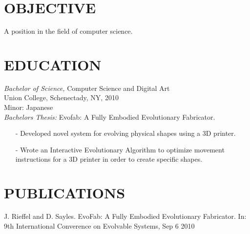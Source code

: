 \documentclass[margin, 10pt]{res} %
\begin{document}
\begin{resume}

 
\section{OBJECTIVE}  

A position in the field of computer science.


\section{EDUCATION}

{\sl Bachelor of Science,} Computer Science and Digital Art \\
Union College, Schenectady, NY, 2010 \\
Minor: Japanese \\
{\sl Bachelors Thesis:} Evofab: A Fully Embodied Evolutionary Fabricator.
\begin{itemize}
\item[-] Developed novel system for evolving physical shapes using a 3D printer.
\item[-] Wrote an Interactive Evolutionary Algorithm to optimize movement instructions for a 3D printer in order to create specific shapes.
\end{itemize}

 
\section{PUBLICATIONS}
J. Rieffel and D. Sayles. EvoFab: A Fully Embodied Evolutionary Fabricator.  In: 9th International Converence on Evolvable Systems, Sep 6 2010 \\
 


\end{resume}
\end{document}
